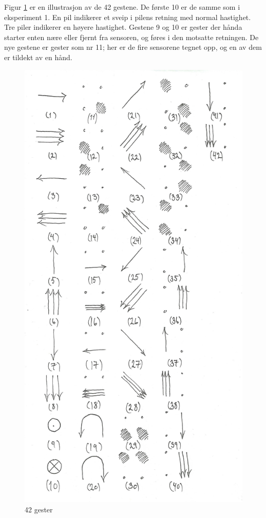 Figur \ref{fig:42} er en illustrasjon av de 42 gestene. De første 10 er de samme som i eksperiment 1. En pil indikerer et sveip i pilens retning med normal hastighet. Tre piler indikerer en høyere hastighet. Gestene 9 og 10 er gester der hånda starter enten nære eller fjernt fra sensoren, og føres i den motsatte retningen. De nye gestene er gester som nr 11; her er de fire sensorene tegnet opp, og en av dem er tildekt av en hånd. 
\begin{figure}
\centering
\includegraphics[scale=0.2]{fig/42-gestures}
\caption{42 gester}
\label{fig:42}
\end{figure}
